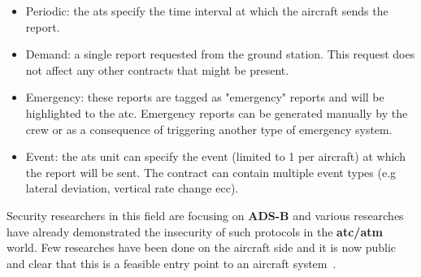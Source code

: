 \documentclass[../main.tex]{subfiles}
\begin{document}
\begin{itemize}
  \item Periodic: the \acrshort{ats} specify the time interval at which the aircraft sends the report.
  \item Demand: a single report requested from the ground station. This request does not affect any other contracts that might be present.
  \item Emergency: these reports are tagged as "emergency" reports and will be highlighted to the \acrshort{atc}. Emergency reports can be generated manually by the crew or as a consequence of triggering another type of emergency system.
  \item Event: the \acrshort{ats} unit can specify the event (limited to 1 per aircraft) at which the report will be sent. The contract can contain multiple event types (e.g lateral deviation, vertical rate change ecc).
\end{itemize}

Security researchers in this field are focusing on \textbf{ADS-B} and various researches \cite{costin2012ghost,renderman} have already demonstrated the insecurity of such protocols in the \textbf{\acrshort{atc}/\acrshort{atm}} world. Few researches have been done on the aircraft side and it is now public and clear that this is a feasible entry point to an aircraft system~\cite{news-boeinghack-cso}.
\end{document}
